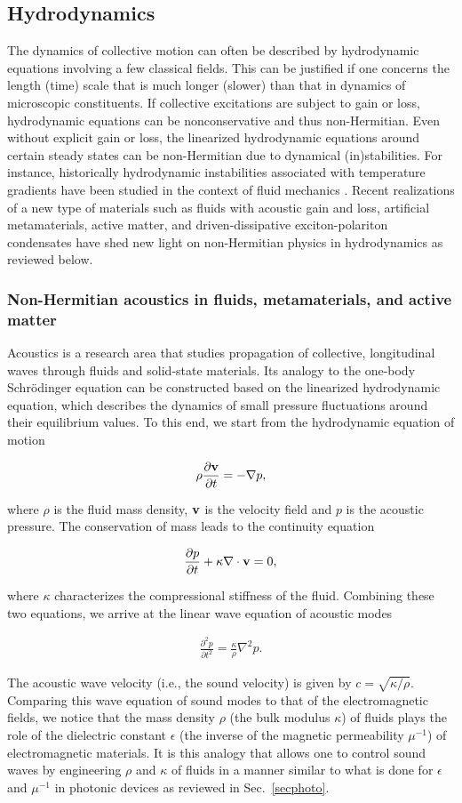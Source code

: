 \documentclass{tADP2e}
\theoremstyle{plain}
\newcommand{\eqn}[1]{
\begin{eqnarray}
	#1
\end{eqnarray}
}
\theoremstyle{plain}
\theoremstyle{definition}
\begin{document}
\subsection{Hydrodynamics\label{sechydro}}
The dynamics of collective motion can often be described by hydrodynamic equations involving a few classical fields. This can be justified if one concerns the length (time) scale that is much longer (slower) than that in dynamics of microscopic constituents. If collective excitations are subject to gain or loss, hydrodynamic equations can be nonconservative and thus non-Hermitian. Even without explicit gain or loss, the linearized hydrodynamic equations around certain steady states can be non-Hermitian due to dynamical (in)stabilities. For instance, historically hydrodynamic instabilities associated with temperature gradients have been studied in the context of fluid mechanics \cite{busse_1970}. Recent realizations of a new type of materials such as fluids with acoustic gain and loss, artificial metamaterials, active matter,  and driven-dissipative exciton-polariton condensates have shed new light on non-Hermitian physics in hydrodynamics as reviewed below.  

\subsubsection{Non-Hermitian acoustics in fluids, metamaterials, and active matter\label{sechydroaco}}
Acoustics is a research area that studies propagation of collective, longitudinal waves through fluids and solid-state materials. Its analogy to the one-body Schr{\"o}dinger equation can be constructed based on the linearized hydrodynamic equation, which describes the dynamics of small pressure fluctuations around their equilibrium values. To this end, we start from the hydrodynamic equation of motion 
\eqn{
\rho\frac{\partial{\bf v}}{\partial t}=-\nabla p,
}
where $\rho$ is the fluid mass density, $\bf v$ is the velocity field and $p$ is the acoustic pressure. The conservation of mass leads to the continuity equation
\eqn{
\frac{\partial p}{\partial t}+\kappa\nabla\cdot {\bf v}=0,
} 
where $\kappa$ characterizes the compressional stiffness of the fluid. Combining these two equations, we arrive at the linear wave equation of acoustic modes
\eqn{
\frac{\partial^2 p}{\partial t^2}=\frac{\kappa}{\rho}\nabla^2 p.
}
The acoustic wave velocity (i.e., the sound velocity) is given by 
$c=\sqrt{\kappa/\rho}$. Comparing this wave equation of sound modes to that of the electromagnetic fields, we notice that the mass density $\rho$ (the bulk modulus $\kappa$) of fluids plays the role of the dielectric constant $\epsilon$ (the inverse of the magnetic permeability $\mu^{-1}$) of electromagnetic materials. It is this analogy that allows one to control sound waves by engineering $\rho$ and $\kappa$ of fluids in a manner similar to what is done for $\epsilon$ and $\mu^{-1}$ in photonic devices as reviewed in Sec.~\ref{secphoto}.
\end{document}
